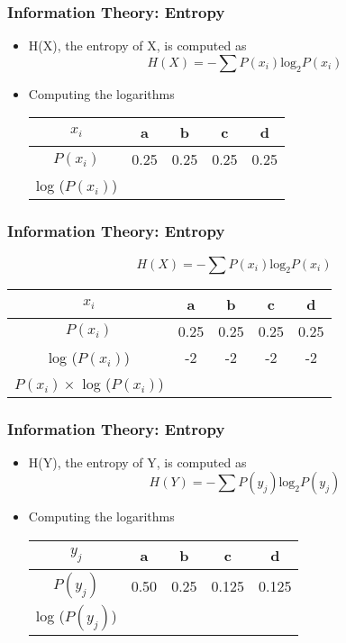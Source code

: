 ﻿\documentclass[a4]{beamer}
\begin{document}
\begin{frame}
\frametitle{Information Theory: Entropy}
\Large
\vspace{-0.7cm}
\begin{itemize}
\item H(X), the entropy of X, is computed as\\
 \[H(X) = -\sum P(x_i) \mbox{log}_2P(x_i)\] 

\item Computing the logarithms
\LARGE

\begin{tabular}{|c|c|c|c|c|}
\hline $x_i$ & a & b & c & d \\ 
\hline $P(x_i)$ & 0.25 & 0.25 & 0.25 & 0.25 \\ 
\hline log ($P(x_i)$) &  &  &  &  \\ 
\hline 
\end{tabular} 
\end{itemize}
\end{frame}
\begin{frame}
\frametitle{Information Theory: Entropy}
\Large
\vspace{-1cm}
 \[H(X) = -\sum P(x_i) \mbox{log}_2P(x_i)\]
\begin{center}
\LARGE
\begin{tabular}{|c|c|c|c|c|}
\hline $x_i$ & a & b & c & d \\ 
\hline $P(x_i)$ & 0.25 & 0.25 & 0.25 & 0.25 \\ 
\hline log ($P(x_i)$) & -2 & -2 & -2 & -2 \\ 
\hline $P(x_i) \times$ log ($P(x_i)$)&  &  &  &  \\ 
\hline 
\end{tabular} 
\end{center}
\end{frame}

 \begin{frame}
 \frametitle{Information Theory: Entropy}
 \Large
 \vspace{-0.7cm}
 \begin{itemize}
 \item H(Y), the entropy of Y, is computed as\\
  \[H(Y) = -\sum P(y_j) \mbox{log}_2P(y_j)\]
 
 \item Computing the logarithms
 \LARGE
 
 \begin{tabular}{|c|c|c|c|c|}
 \hline $y_j$ & a & b & c & d \\ 
 \hline $P(y_j)$ & 0.50 & 0.25 & 0.125 & 0.125 \\ 
 \hline log ($P(y_j)$) &  &  &  &  \\ 
 \hline 
 \end{tabular} 
 \end{itemize}
 \end{frame}
 
\end{document}
